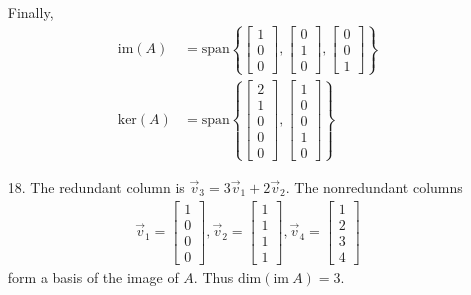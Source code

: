 \documentclass[letterpaper,12pt]{article}
\begin{document}
\begin{enumerate}
    Finally,
    \begin{align*}
      \text{im}(A) &= \text{span}\left\{
        \begin{bmatrix}
          1 \\ 0 \\ 0
        \end{bmatrix},
        \begin{bmatrix}
          0 \\ 1 \\ 0
        \end{bmatrix},
        \begin{bmatrix}
          0 \\ 0 \\ 1
        \end{bmatrix}
      \right\} \\
      \text{ker}(A) &= \text{span}\left\{
        \begin{bmatrix}
          2 \\ 1 \\ 0 \\ 0 \\ 0
        \end{bmatrix},
        \begin{bmatrix}
          1 \\ 0 \\ 0 \\ 1 \\ 0
        \end{bmatrix}
      \right\}
    \end{align*}
  \item[18.]
    The redundant column is $\vec{v}_3 = 3\vec{v}_1 + 2\vec{v}_2$. The nonredundant columns
    \begin{align*}
      \vec{v}_1 = \begin{bmatrix}
        1 \\ 0 \\ 0 \\ 0
      \end{bmatrix},
      \vec{v}_2 = \begin{bmatrix}
        1 \\ 1 \\ 1 \\ 1
      \end{bmatrix},
      \vec{v}_4 = \begin{bmatrix}
        1 \\ 2 \\ 3 \\ 4
      \end{bmatrix}
    \end{align*}
    form a basis of the image of $A$. Thus $\text{dim}(\text{im} \ A) = 3$.


\end{enumerate}
\end{document}
